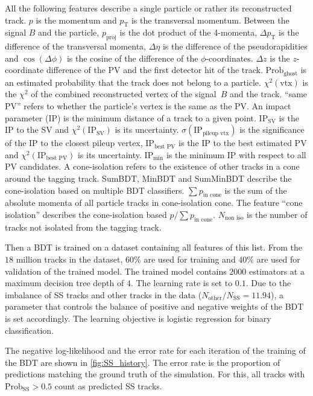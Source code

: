All the following features describe a single particle or rather its reconstructed track.
%
$p$ is the momentum and
$p_\text{T}$ is the transversal momentum. 
%
Between the signal $B$ and the particle,
$p_\text{proj}$ is the dot product of the 4-momenta,
$\Delta p_\text{T}$ is the difference of the transversal momenta,    
$\Delta \eta$ is the difference of the pseudorapidities and   
$\cos(\Delta \phi)$ is the cosine of the difference of the $\phi$-coordinates. 
$\Delta z$ is the $z$-coordinate difference of the PV and the first detector hit of the track. 
%  
$\text{Prob}_\text{ghost}$ is an estimated probability that the track does not belong to a particle. %
$\chi^2(\text{vtx})$ is the $\chi^2$ of the combined reconstructed vertex of the signal~$B$ and the track. 
\enquote{same PV} refers to whether the particle's vertex is the same as the PV.
%
An impact parameter (IP) is the minimum distance of a track to a given point.
$\text{IP}_\text{SV}$ is the IP to the SV and  
$\chi^2(\text{IP}_\text{SV})$ is its uncertainty.
$\sigma(\text{IP}_\text{pileup vtx})$ is the significance of the IP to the closest pileup vertex,
$\text{IP}_\text{best PV}$ is the IP to the best estimated PV and  
$\chi^2(\text{IP}_\text{best PV})$ is its uncertainty.
$\text{IP}_\text{min}$ is the minimum IP with respect to all PV candidates.
%
A cone-isolation refers to the existence of other tracks in a cone around the tagging track.
SumBDT,    
MinBDT and    
SumMinBDT describe the cone-isolation based on multiple BDT classifiers.
$\sum p_\text{in cone}$ is the sum of the absolute momenta of all particle tracks in cone-isolation cone.
The feature \enquote{cone isolation} describes the cone-isolation based $p/\sum p_\text{in cone}$. 
$N_\text{non iso}$ is the number of tracks not isolated from the tagging track.   

Then a BDT is trained on a dataset containing all features of this list.
From the $18$ million tracks in the dataset, $60\%$ are used for training and $40\%$ are used for validation of the trained model.
The trained model contains $2000$ estimators at a maximum decision tree depth of $4$.
The learning rate is set to $0.1$.
Due to the imbalance of SS tracks and other tracks in the data ($N_\text{other}/N_\text{SS} = 11.94$), a parameter that controls the balance of positive and negative weights of the BDT is set accordingly. %
The learning objective is logistic regression for binary classification.

The negative log-likelihood and the error rate for each iteration of the training of the BDT are shown in \autoref{fig:SS_history}.
The error rate is the proportion of predictions matching the ground truth of the simulation.
For this, all tracks with $\text{Prob}_\text{SS}>0.5$ count as predicted SS tracks. 

